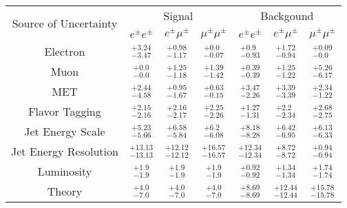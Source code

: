 
\renewcommand{\arraystretch}{1.5}
\begin{tabular}{c||ccc|ccc}
\hline
\multirow{2}{*}{Source of Uncertainty} & \multicolumn{3}{c|}{Signal} & \multicolumn{3}{c}{Backgound} \\
        &$e^\pm e^\pm$ &$e^\pm \mu^\pm$ &$\mu^\pm \mu^\pm$ &$e^\pm e^\pm$ &$e^\pm \mu^\pm$ &$\mu^\pm \mu^\pm$ \\ \hline  \hline
Electron  &$^{+3.24}_{-3.47}$  &$^{+0.98}_{-1.17}$  &$^{+0.0}_{-0.07}$  &$^{+0.9}_{-0.93}$  &$^{+1.72}_{-0.94}$  &$^{+0.09}_{-0.0}$\\
Muon  &$^{+0.0}_{-0.0}$  &$^{+1.25}_{-1.18}$  &$^{+1.39}_{-1.42}$  &$^{+0.39}_{-0.39}$  &$^{+1.25}_{-1.22}$  &$^{+5.26}_{-6.17}$\\
MET  &$^{+2.44}_{-4.58}$  &$^{+0.95}_{-1.67}$  &$^{+0.63}_{-0.15}$  &$^{+3.47}_{-2.26}$  &$^{+3.39}_{-3.39}$  &$^{+2.34}_{-1.22}$\\
Flavor Tagging  &$^{+2.15}_{-2.16}$  &$^{+2.16}_{-2.17}$  &$^{+2.25}_{-2.26}$  &$^{+1.27}_{-1.31}$  &$^{+2.2}_{-2.34}$  &$^{+2.68}_{-2.75}$\\
Jet Energy Scale  &$^{+5.23}_{-5.66}$  &$^{+6.58}_{-5.84}$  &$^{+6.2}_{-6.08}$  &$^{+8.18}_{-8.28}$  &$^{+6.42}_{-6.95}$  &$^{+6.13}_{-6.33}$\\
Jet Energy Resolution  &$^{+13.13}_{-13.13}$  &$^{+12.12}_{-12.12}$  &$^{+16.57}_{-16.57}$  &$^{+12.34}_{-12.34}$  &$^{+8.72}_{-8.72}$  &$^{+0.94}_{-0.94}$\\
Luminosity  &$^{+1.9}_{-1.9}$  &$^{+1.9}_{-1.9}$  &$^{+1.9}_{-1.9}$  &$^{+0.92}_{-0.92}$  &$^{+1.34}_{-1.34}$  &$^{+1.74}_{-1.74}$\\
Theory  &$^{+4.0}_{-7.0}$  &$^{+4.0}_{-7.0}$  &$^{+4.0}_{-7.0}$  &$^{+8.69}_{-8.69}$  &$^{+12.44}_{-12.44}$  &$^{+15.78}_{-15.78}$\\
\hline\hline 
\end{tabular}

